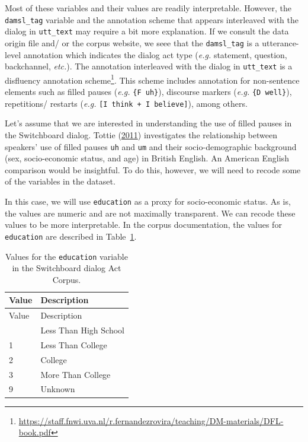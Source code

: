 \documentclass[
  letterpaper,
  DIV=11,
  numbers=noendperiod]{scrreport}
\theoremstyle{definition}
\theoremstyle{remark}
\DeclareRobustCommand{\href}[2]{#2\footnote{\url{#1}}}
\begin{document}
Most of these variables and their values are readily interpretable.
However, the \texttt{damsl\_tag} variable and the annotation scheme that
appears interleaved with the dialog in \texttt{utt\_text} may require a
bit more explanation. If we consult the data origin file and/ or the
corpus website, we seee that the \texttt{damsl\_tag} is a
utterance-level annotation which indicates the dialog act type
(\emph{e.g.} statement, question, backchannel, \emph{etc.}). The
annotation interleaved with the dialog in \texttt{utt\_text} is a
\href{https://staff.fnwi.uva.nl/r.fernandezrovira/teaching/DM-materials/DFL-book.pdf}{disfluency
annotation scheme}. This scheme includes annotation for non-sentence
elements such as filled pauses (\emph{e.g.} \texttt{\{F\ uh\}}),
discourse markers (\emph{e.g.} \texttt{\{D\ well\}}), repetitions/
restarts (\emph{e.g.} \texttt{{[}I\ think\ +\ I\ believe{]}}), among
others.

Let's assume that we are interested in understanding the use of filled
pauses in the Switchboard dialog. Tottie
(\protect\hyperlink{ref-Tottie2011}{2011}) investigates the relationship
between speakers' use of filled pauses \texttt{uh} and \texttt{um} and
their socio-demographic background (sex, socio-economic status, and age)
in British English. An American English comparison would be insightful.
To do this, however, we will need to recode some of the variables in the
dataset.

In this case, we will use \texttt{education} as a proxy for
socio-economic status. As is, the values are numeric and are not
maximally transparent. We can recode these values to be more
interpretable. In the corpus documentation, the values for
\texttt{education} are described in Table~\ref{tbl-td-swda-education}.

\hypertarget{tbl-td-swda-education}{}
\begin{longtable}[]{@{}ll@{}}
\caption{\label{tbl-td-swda-education}Values for the \texttt{education}
variable in the Switchboard dialog Act Corpus.}\tabularnewline
\toprule\noalign{}
Value & Description \\
\midrule\noalign{}
\endfirsthead
\toprule\noalign{}
Value & Description \\
\midrule\noalign{}
\endhead
\bottomrule\noalign{}
\endlastfoot
0 & Less Than High School \\
1 & Less Than College \\
2 & College \\
3 & More Than College \\
9 & Unknown \\
\end{longtable}
\end{document}
